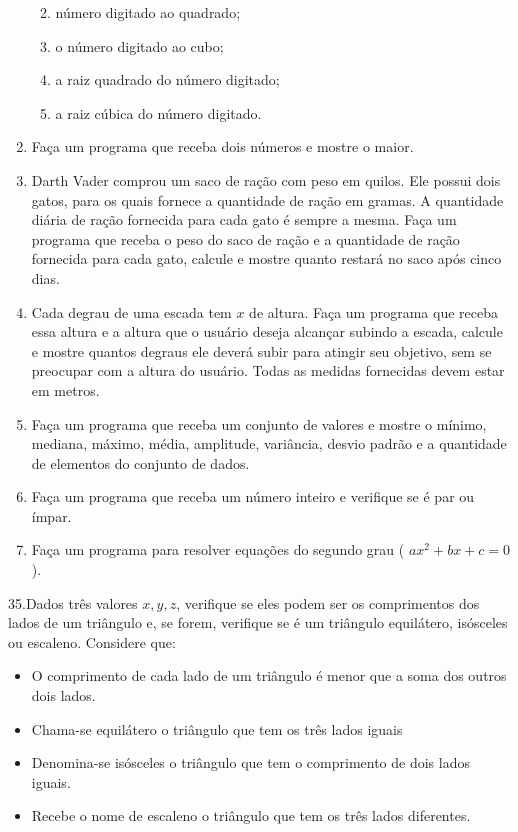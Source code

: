 \documentclass[
]{article}
\providecommand{\tightlist}{%
  \setlength{\itemsep}{0pt}\setlength{\parskip}{0pt}}
\begin{document}
\begin{enumerate}
  \begin{enumerate}
  \def\labelenumii{\alph{enumii}.}
  \tightlist
  \item
    número digitado ao quadrado;
  \item
    o número digitado ao cubo;
  \item
    a raiz quadrado do número digitado;
  \item
    a raiz cúbica do número digitado.
  \end{enumerate}
\item
  Faça um programa que receba dois números e mostre o maior.
\item
  Darth Vader comprou um saco de ração com peso em quilos. Ele possui
  dois gatos, para os quais fornece a quantidade de ração em gramas. A
  quantidade diária de ração fornecida para cada gato é sempre a mesma.
  Faça um programa que receba o peso do saco de ração e a quantidade de
  ração fornecida para cada gato, calcule e mostre quanto restará no
  saco após cinco dias.
\item
  Cada degrau de uma escada tem \(x\) de altura. Faça um programa que
  receba essa altura e a altura que o usuário deseja alcançar subindo a
  escada, calcule e mostre quantos degraus ele deverá subir para atingir
  seu objetivo, sem se preocupar com a altura do usuário. Todas as
  medidas fornecidas devem estar em metros.
\item
  Faça um programa que receba um conjunto de valores e mostre o mínimo,
  mediana, máximo, média, amplitude, variância, desvio padrão e a
  quantidade de elementos do conjunto de dados.
\item
  Faça um programa que receba um número inteiro e verifique se é par ou
  ímpar.
\item
  Faça um programa para resolver equações do segundo grau (
  \(ax^2 + bx + c = 0\) ).
\end{enumerate}

35.Dados três valores \(x, y, z\), verifique se eles podem ser os
comprimentos dos lados de um triângulo e, se forem, verifique se é um
triângulo equilátero, isósceles ou escaleno. Considere que:

\begin{itemize}
\tightlist
\item
  O comprimento de cada lado de um triângulo é menor que a soma dos
  outros dois lados.
\item
  Chama-se equilátero o triângulo que tem os três lados iguais
\item
  Denomina-se isósceles o triângulo que tem o comprimento de dois lados
  iguais.
\item
  Recebe o nome de escaleno o triângulo que tem os três lados
  diferentes.
\end{itemize}
\end{document}
